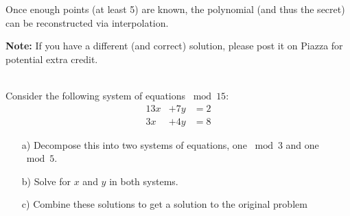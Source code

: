 \documentclass[]{article}
\begin{document}
\begin{qunlist}
{{Once enough points (at least 5) are known, the polynomial (and thus the secret) can be reconstructed via interpolation.

\textbf{Note:} If you have a different (and correct) solution, please post it on Piazza for potential extra credit.

}}\fi



\\ %
Consider the following system of equations $\bmod{15}$:
\begin{align*}
13x &+ 7y &= 2 \\
3x &+ 4y &= 8
\end{align*}

\begin{itemize}  
\qpart
\item[a)] Decompose this into two systems of equations, one $\bmod 3$ and one $\bmod 5$.
\qpart
\item[b)] Solve for $x$ and $y$ in both systems.
\qpart
\item[c)] Combine these solutions to get a solution to the original problem
\end{itemize}



\end{qunlist}
\end{document}

